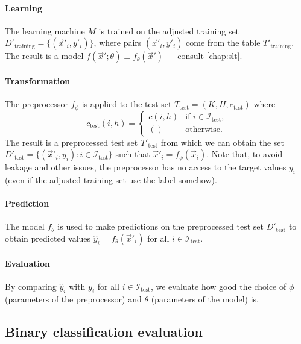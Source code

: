 \paragraph{Learning}

The learning machine $M$ is trained on the adjusted training set $D'_\text{training} =
\{(\vec{x}'_i, y'_i)\}$, where pairs $(\vec{x}'_i, y'_i)$ come from the table
$T'_\text{training}$.  The result is a model $f(\vec{x}'; \theta) \equiv
f_\theta(\vec{x}')$ --- consult \cref{chap:slt}.

\paragraph{Transformation}

The preprocessor $f_\phi$ is applied to the test set $T_\text{test} = (K, H,
c_\text{test})$ where \[
  c_\text{test}(i, h) = \begin{cases}
    c(i, h) & \text{if } i \in \mathcal{I}_\text{test}\text{,} \\
    () & \text{otherwise}\text{.}
  \end{cases}
\]  The result is a preprocessed test set $T'_\text{test}$ from which we can obtain the
    set $D'_\text{test} = \{(\vec{x}'_i, y_i) : i \in \mathcal{I}_\text{test}\}$ such
    that $\vec{x}'_i = f_\phi(\vec{x}_i)$.  Note that, to avoid \gls{leakage} and other
    issues, the preprocessor has no access to the target values $y_i$ (even if the
    adjusted training set use the label somehow).

\paragraph{Prediction}

The model $f_\theta$ is used to make predictions on the preprocessed test set
    $D'_\text{test}$ to obtain predicted values $\hat{y}_i = f_\theta(\vec{x}'_i)$ for all
    $i \in \mathcal{I}_\text{test}$.

\paragraph{Evaluation}

By comparing $\hat{y}_i$ with $y_i$ for all $i \in \mathcal{I}_\text{test}$, we
evaluate how good the choice of $\phi$ (parameters of the preprocessor) and $\theta$
(parameters of the model) is.

\subsection{Binary classification evaluation}

